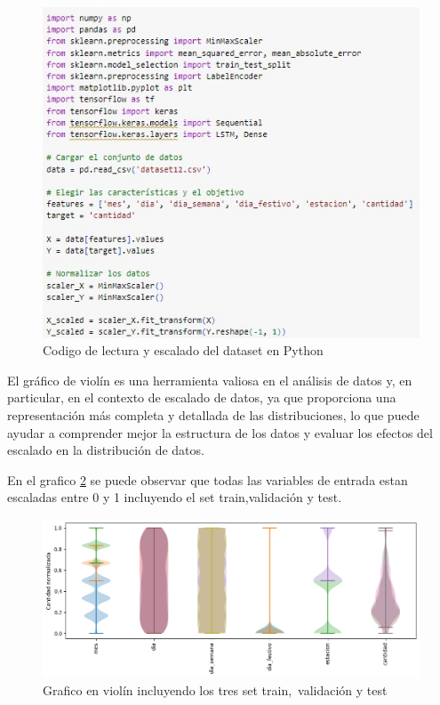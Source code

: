 \begin{figure}[H]
  \begin{center}
    \includegraphics[scale=0.90]{./lectura_escalado.jpg}
    \caption{Codigo de lectura y escalado del dataset en Python}
    \label{fig:lectura_escalado}
  \end{center}
\end{figure}

El gráfico de violín es una herramienta valiosa en el análisis de datos y, en particular, en el contexto de escalado de datos, ya que proporciona una representación más completa y detallada de las distribuciones, lo que puede ayudar a comprender mejor la estructura de los datos y evaluar los efectos del escalado en la distribución de datos.

\vspace{1\baselineskip}
En el grafico \ref{fig:grafico_violin} se puede observar que todas las variables de entrada estan escaladas entre 0 y 1 incluyendo el set train,validación y test.
\begin{figure}[H]
  \begin{center}
    \includegraphics[scale=0.50]{./grafico tipo violin de escalado.png}
    \caption{Grafico en violín incluyendo los tres set train, validación y test}
    \label{fig:grafico_violin}
  \end{center}
\end{figure}

